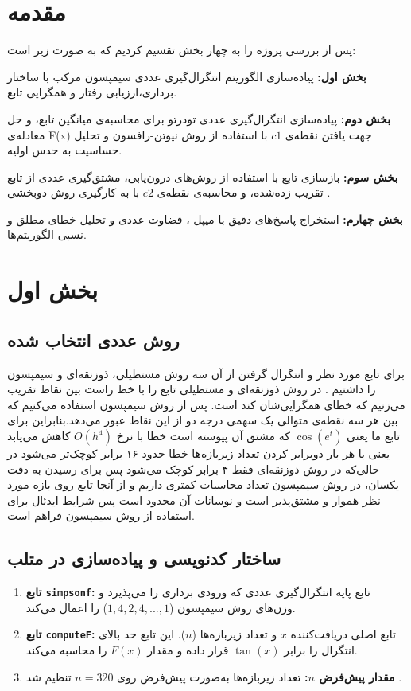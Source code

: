 \documentclass{article}
\begin{document}
\tableofcontents    
\newpage
{}
\section*{مقدمه}
\begin{flushright}
پس از بررسی پروژه را به چهار بخش تقسیم کردیم که به صورت زیر است:
	\vspace{2mm}
	
	\textbf{بخش اول:} پیاده‌سازی الگوریتم انتگرال‌گیری عددی سیمپسون مرکب با ساختار برداری،ارزیابی رفتار و همگرایی تابع.
	
	\textbf{بخش دوم:} پیاده‌سازی انتگرال‌گیری عددی تودرتو برای محاسبه‌ی میانگین تابع، و حل معادله‌ی F(x) جهت یافتن نقطه‌ی $c1$ با استفاده از روش نیوتن-رافسون و تحلیل حساسیت به حدس اولیه.
	
	\textbf{بخش سوم:}  بازسازی تابع با استفاده از روش‌های درون‌یابی، مشتق‌گیری عددی از تابع تقریب ‌زده‌شده، و محاسبه‌ی نقطه‌ی  $c2 $ با به ‌کارگیری روش دوبخشی  .
	
 \textbf{بخش چهارم: }استخراج پاسخ‌های دقیق با میپل ، قضاوت عددی و تحلیل خطای مطلق و نسبی الگوریتم‌ها.
 
 
\section{بخش اول}
\subsection{روش عددی انتخاب ‌شده}
برای تابع مورد نظر و انتگرال گرفتن از آن سه روش مستطیلی، ذوزنقه‌ای و سیمپسون را داشتیم . در روش ذوزنقه‌ای و مستطیلی تابع را با خط راست بین نقاط تقریب می‌زنیم که خطای همگرایی‌شان کند است. پس از روش سیمپسون استفاده می‌کنیم که بین هر سه نقطه‌ی متوالی یک سهمی درجه دو از این نقاط عبور می‌دهد.بنابراین برای تابع ما یعنی $ \cos(e^t) $ که مشتق آن پیوسته است خطا با نرخ $O(h^4)$ کاهش می‌یابد یعنی با هر بار دوبرابر کردن تعداد زیربازه‌ها خطا حدود ۱۶ برابر کوچک‌تر می‌شود در حالی‌که در روش ذوزنقه‌ای فقط ۴ برابر کوچک می‌شود پس برای رسیدن به دقت یکسان، در روش سیمپسون تعداد محاسبات کمتری داریم و از آنجا تابع روی بازه مورد نظر هموار و مشتق‌پذیر است و نوسانات آن محدود است پس شرایط ایدئال برای استفاده از روش سیمپسون فراهم است.
\subsection{ساختار کدنویسی و پیاده‌سازی در متلب}
\begin{enumerate}
	\item \textbf{تابع \texttt{simpsonf}:} تابع پایه انتگرال‌گیری عددی که ورودی برداری را می‌پذیرد و وزن‌های روش سیمپسون ($1, 4, 2, 4, ..., 1$) را اعمال می‌کند.
	\item \textbf{تابع \texttt{computeF}:} تابع اصلی دریافت‌کننده $x$ و تعداد زیربازه‌ها ($n$). این تابع حد بالای انتگرال را برابر $\tan(x)$ قرار داده و مقدار $F(x)$ را محاسبه می‌کند.
	\item \textbf{مقدار پیش‌فرض $n$:} تعداد زیربازه‌ها به‌صورت پیش‌فرض روی $n = 320$ تنظیم شد .
\end{enumerate}
\newpage

\end{flushright}
\end{document}
